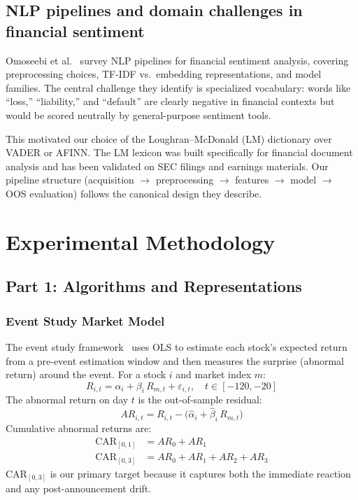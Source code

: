 \documentclass[conference]{IEEEtran}
\begin{document}
\subsection{NLP pipelines and domain challenges in financial sentiment}

Omoseebi et al.~\cite{ref_omoseebi2023} survey NLP pipelines for financial
sentiment analysis, covering preprocessing choices, TF-IDF vs.\ embedding
representations, and model families. The central challenge they identify is
specialized vocabulary: words like ``loss,'' ``liability,'' and ``default'' are
clearly negative in financial contexts but would be scored neutrally by
general-purpose sentiment tools.

This motivated our choice of the Loughran--McDonald (LM) dictionary over VADER
or AFINN. The LM lexicon was built specifically for financial document analysis
and has been validated on SEC filings and earnings materials. Our pipeline
structure (acquisition $\rightarrow$ preprocessing $\rightarrow$ features
$\rightarrow$ model $\rightarrow$ OOS evaluation) follows the canonical design
they describe.

\section{Experimental Methodology}
\label{sec:methodology}

\subsection{Part 1: Algorithms and Representations}

\subsubsection{Event Study Market Model}

The event study framework~\cite{ref_suzuki2020} uses OLS to estimate each
stock's expected return from a pre-event estimation window and then measures
the surprise (abnormal return) around the event. For a stock $i$ and market
index $m$:
\begin{equation}
R_{i,t} = \alpha_i + \beta_i \, R_{m,t} + \varepsilon_{i,t}, \quad t \in [-120,-20]
\end{equation}
The abnormal return on day $t$ is the out-of-sample residual:
\begin{equation}
AR_{i,t} = R_{i,t} - \bigl(\hat\alpha_i + \hat\beta_i \, R_{m,t}\bigr)
\end{equation}
Cumulative abnormal returns are:
\begin{align}
\text{CAR}_{[0,1]} &= AR_0 + AR_1 \\
\text{CAR}_{[0,3]} &= AR_0 + AR_1 + AR_2 + AR_3
\end{align}
CAR$_{[0,3]}$ is our primary target because it captures both the immediate
reaction and any post-announcement drift.
\end{document}
